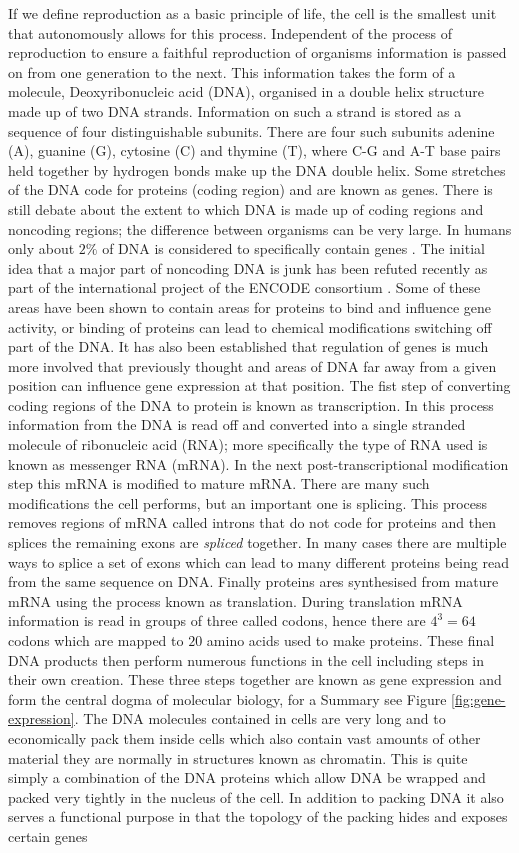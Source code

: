 If we define reproduction as a basic principle of life, the cell is the smallest unit that autonomously allows for this process. Independent of the process of reproduction to ensure a faithful reproduction of organisms information is passed on from one generation to the next. This information takes the form of a molecule, Deoxyribonucleic acid (DNA), organised in a double helix structure made up of two DNA strands. Information on such a strand is stored as a sequence of four distinguishable subunits. There are four such subunits adenine (A), guanine (G), cytosine (C) and thymine (T), where C-G and A-T base pairs held together by hydrogen bonds make up the DNA double helix. Some stretches of the DNA code for proteins (coding region) and are known as genes.  There is still debate about the extent to which DNA is made up of coding regions and noncoding regions; the difference between organisms can be very large. In humans only about $2\%$ of DNA is considered to specifically contain genes \citep{Elgar:2008dm}. The initial idea that a major part of noncoding DNA is junk has been refuted recently as part of the international project of the ENCODE consortium \citep{Pennisi:2012wl}. Some of these areas have been shown to contain areas for proteins to bind and influence gene activity, or binding of proteins can lead to chemical modifications switching off part of the DNA. It has also been established that regulation of genes is much more involved that previously thought and areas of DNA far away from a given position can influence gene expression at that position. The fist step of converting coding regions of the DNA to protein is known as transcription. In this process information from the DNA is read off and converted into a single stranded molecule of ribonucleic acid (RNA); more specifically the type of RNA used is known as messenger RNA (mRNA). In the next post-transcriptional modification step this mRNA is modified to mature mRNA. There are many such modifications the cell performs, but an important one is splicing. This process removes regions of mRNA called introns that do not code for proteins and then splices the remaining exons are \emph{spliced} together. In many cases there are multiple ways to splice a set of exons which can lead to many different proteins being read from the same sequence on DNA. Finally proteins ares synthesised from mature mRNA using the process known as translation. During translation mRNA information is read in groups of three called codons, hence there are $4^3 = 64$ codons which are mapped to $20$ amino acids used to make proteins. These final  DNA products then perform numerous functions in the cell including steps in their own creation. These three steps together are known as gene expression and form the central dogma of molecular biology, for a Summary see Figure \ref{fig:gene-expression}. The DNA molecules contained in cells are very long and to economically pack them inside cells which also contain vast amounts of other material they are normally in structures known as chromatin. This is quite simply a combination of the DNA proteins which allow DNA be wrapped and packed very tightly in the nucleus of the cell. In addition to packing DNA it also serves a functional purpose in that the topology of the packing hides and exposes certain genes 